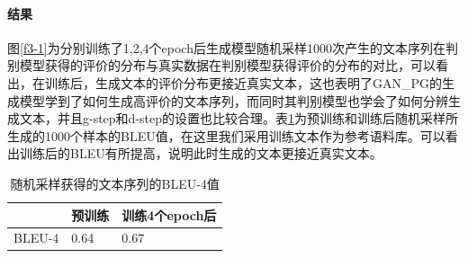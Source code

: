 \paragraph{结果}
图\ref{f3-1}为分别训练了1,2,4个epoch后生成模型随机采样1000次产生的文本序列在判别模型获得的评价的分布与真实数据在判别模型获得评价的分布的对比，可以看出，在训练后，生成文本的评价分布更接近真实文本，这也表明了GAN\_PG的生成模型学到了如何生成高评价的文本序列，而同时其判别模型也学会了如何分辨生成文本，并且g-step和d-step的设置也比较合理。表\ref{t3-5}为预训练和训练后随机采样所生成的1000个样本的BLEU值，在这里我们采用训练文本作为参考语料库。可以看出训练后的BLEU有所提高，说明此时生成的文本更接近真实文本。
\begin{table}[htb]
    \center
    \caption{\label{t3-5}随机采样获得的文本序列的BLEU-4值}
    \begin{tabular*}{\linewidth}{p{.33\linewidth}p{.33\linewidth}p{.33\linewidth}}
\toprule
&预训练&训练4个epoch后\\
\midrule
BLEU-4&0.64&0.67\\
\bottomrule
    \end{tabular*}
\end{table}

